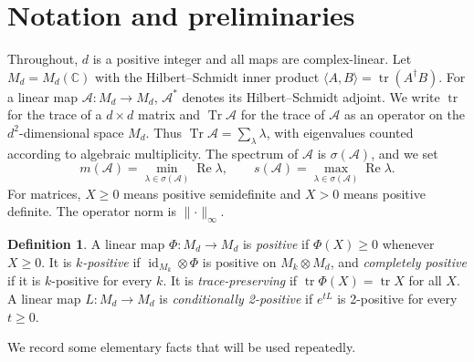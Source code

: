 \documentclass[11pt,a4paper]{article}
\theoremstyle{plain}
\theoremstyle{definition}
\newtheorem{definition}[theorem]{Definition}
\theoremstyle{remark}
\numberwithin{equation}{section}
\newcommand{\C}{\mathbb{C}}
\newcommand{\M}{M_d}
\newcommand{\tr}{\operatorname{tr}}
\newcommand{\Tr}{\operatorname{Tr}}
\newcommand{\Rea}{\operatorname{Re}}
\newcommand{\id}{\operatorname{id}}
\newcommand{\spec}{\sigma}
\newcommand{\mmin}{m}
\newcommand{\smax}{s}
\newcommand{\cA}{\mathcal{A}}
\newcommand{\norm}[1]{\lVert #1\rVert}
\begin{document}
\section{Notation and preliminaries}\label{sec:prelim}

Throughout, $d$ is a positive integer and all maps are complex-linear.
Let $\M=M_d(\C)$ with the Hilbert--Schmidt inner product
$\langle A,B\rangle=\tr(A^\dagger B)$. For a linear map $\cA\colon\M\to\M$,
$\cA^*$ denotes its Hilbert--Schmidt adjoint. We write $\tr$ for the trace of a
$d\times d$ matrix and $\Tr\cA$ for the trace of $\cA$ as an operator on the
$d^2$-dimensional space $\M$. Thus $\Tr\cA=\sum_{\lambda}\lambda$, with eigenvalues
counted according to algebraic multiplicity. The spectrum of $\cA$ is
$\spec(\cA)$, and we set
\[
  \mmin(\cA)=\min_{\lambda\in\spec(\cA)}\Rea\lambda,
  \qquad
  \smax(\cA)=\max_{\lambda\in\spec(\cA)}\Rea\lambda .
\]
For matrices, $X\ge0$ means positive semidefinite and $X>0$ means positive definite.
The operator norm is $\norm{\cdot}_\infty$.

\begin{definition}
A linear map $\Phi\colon\M\to\M$ is \emph{positive} if $\Phi(X)\ge0$ whenever
$X\ge0$. It is \emph{$k$-positive} if $\id_{M_k}\otimes\Phi$ is positive on
$M_k\otimes\M$, and \emph{completely positive} if it is $k$-positive for every
$k$. It is \emph{trace-preserving} if $\tr\Phi(X)=\tr X$ for all $X$. A linear map
$L\colon\M\to\M$ is \emph{conditionally 2-positive} if $e^{tL}$ is 2-positive for
every $t\ge0$.
\end{definition}

We record some elementary facts that will be used repeatedly.
\end{document}
